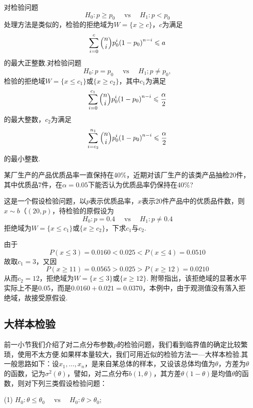 对检验问题
\begin{equation}\label{eq7.3.10}
H _ { 0 } : p \geq p _ { 0 } \quad \text { vs } \quad H _ { 1 } : p < p _ { 0 }
\end{equation}
处理方法是类似的，检验的拒绝域为$W=\{x\geq c\}$，$c$为满足
\[\sum _ { i = 0 } ^ { c } \Binom ni p _ { 0 } ^ { i } \left( 1 - p _ { 0 } \right) ^ { n - i } \leq a\]
的最大正整数.对检验问题
\begin{equation}\label{eq7.3.11}
H _ { 0 } : p = p _ { 0 } \quad \text { vs } \quad H _ { 1 } ; p \neq p _ { 0 },
\end{equation}
检验的拒绝域$W=\{x\leq c_{1}\}$或$\{x\geq c_{2}\}$，其中$c_{1}$为满足
\[\sum _ { i = 0 } ^ { c _ { 1 } } \Binom ni p _ { 0 } ^ { i } \left( 1 - p _ { 0 } \right) ^ { n - i } \leq \frac { \alpha } { 2 }\]
的最大整数，$c_{2}$为满足
\[\sum _ { i = c _ { 2 } } ^ { n _ { 1 } }\Binom ni p _ { 0 } ^ { i } \left( 1 - p _ { 0 } \right) ^ { n - i } \leq \frac { \alpha } { 2 }\]
的最小整数.
\begin{example}\label{exam7.3.2}
	某厂生产的产品优质品率一直保持在40\%，近期对该厂生产的该类产品抽检20件，其中优质品7件，在$\alpha=0.05$下能否认为优质品率仍保持在40\%?
	
	这是一个假设检验问题，以$p$表示优质品率，$x$表示20件产品中的优质品件数，则$x\sim b（(20,p)$，待检验的原假设为
	\[H _ { 0 } : p = 0.4 \quad \text { vs } \quad H _ { 1 } : p \neq 0.4\]
	拒绝域为$W=\{x\leq c_{1}\}$或$\{x\geq c_{2}\}$，下求$c_{1}$与$c_{2}$.
		
	由于
	\[P ( x \leq 3 ) = 0.0160 < 0.025 < P ( x \leq 4 ) = 0.0510\]
	故取$c_{1}=3$，又因
	\[P ( x \geq 11 ) = 0.0565 > 0.025 > P ( x \geq 12 ) = 0.0210\]
	从而$c_{2}=12$，拒绝域为$W=\{x\leq 3\}$或$\{x\geq 12\}$. 附带指出，该拒绝域的显著水平实际上不是0.05，而是$0.0160+0.021=0.0370$，本例中，由于观测值没有落入拒绝域，故接受原假设.
\end{example}

\subsection{大样本检验\label{sec:7.3.3}}
前一小节我们介绍了对二点分布参数$p$的检验问题，我们看到临界值的确定比较繁琐，使用不太方便.如果样本量较大，我们可用近似的检验方法一—大样本检验.其一般思路如下：设$x_{1},\dotsc,x_{n}$，是来自某总体的样本，又设该总体均值为$\theta$，方差为$\theta$的函数，记为$\sigma^{2}(\theta)$，譬如，对二点分布$b(1,\theta)$，其方差$\theta(1-\theta)$是均值$\theta$的函数，则对下列三类假设检验问题：

(1) $H _ { 0 } : \theta \leq \theta _ { 0 } \quad \text { vs } \quad H _ { 0 } : \theta > \theta _ { 0 }$;

